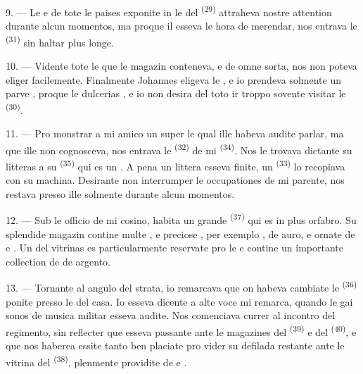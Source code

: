 \VUsaut{3.0mm}

9. --- Le  e  de tote le paises
exponite in le  del  \textsuperscript{(29)}
attraheva nostre attention durante alcun momentos, ma proque il esseva le hora de
merendar, nos entrava le  \textsuperscript{(31)} sin haltar
plus longe.

10. --- Vidente tote le  que le magazin conteneva,
 e  de omne sorta, nos
non poteva eliger facilemente. Finalmente Johannes eligeva le , e io prendeva solmente un parve , proque le
dulcerias , e io non desira del toto ir troppo
sovente visitar le  \textsuperscript{(30)}.

\VUsaut{3.0mm}

11. --- Pro monstrar a mi amico un  super le qual ille
habeva audite parlar, ma que ille non cognosceva, nos entrava le
 \textsuperscript{(32)} de mi 
\textsuperscript{(34)}. Nos le trovava dictante su litteras a su
 \textsuperscript{(35)} qui es un . A pena
un littera esseva finite, un  \textsuperscript{(33)} lo
recopiava con su machina. Desirante non interrumper le occupationes de mi
parente, nos restava presso ille solmente durante alcun momentos.

12. --- Sub le officio de mi cosino, habita un grande 
\textsuperscript{(37)} qui es in plus orfabro. Su splendide magazin contine multe
,  e
preciose , per exemplo ,
 de auro,  e  ornate de
 e . Un del vitrinas es particularmente reservate
pro le  e contine un importante collection de  de argento.

13. --- Tornante al angulo del strata, io remarcava que on habeva cambiate le
 \textsuperscript{(36)} ponite presso le  del casa.
Io esseva dicente a alte voce mi remarca, quando le gai sonos de 
musica militar esseva audite. Nos comenciava currer al incontro del regimento,
sin reflecter que  esseva passante ante le magazines del
 \textsuperscript{(39)} e del 
\textsuperscript{(40)}, e que nos haberea essite tanto ben placiate pro vider su
defilada restante ante le vitrina del  \textsuperscript{(38)},
plenmente providite de  e .

